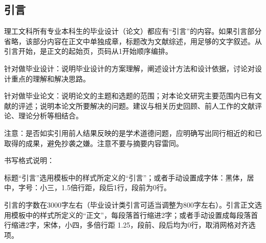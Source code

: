 	\newpage
	\tableofcontents
	\newpage
	\setcounter{page}{1}
	\begin{spacing}{1.7}
		\section*{\fontsize{15}{22.5} {\heiti 引\quad\quad 言}}
	\end{spacing}
	\begin{spacing}{1.4}
	{\songti 理工文科所有专业本科生的毕业设计（论文）都应有“引言”的内容。如果引言部分省略，该部分内容在正文中单独成章，标题改为文献综述，用足够的文字叙述。从引言开始，是正文的起始页，页码从1开始顺序编排。\par 
	针对做毕业设计：说明毕业设计的方案理解，阐述设计方法和设计依据，讨论对设计重点的理解和解决思路。\par 
	针对做毕业论文：说明论文的主题和选题的范围；对本论文研究主要范围内已有文献的评述；说明本论文所要解决的问题。建议与相关历史回顾、前人工作的文献评论、理论分析等相结合。\par 
	注意：是否如实引用前人结果反映的是学术道德问题，应明确写出同行相近的和已取得的成果，避免抄袭之嫌。注意不要与摘要内容雷同。\par 
	书写格式说明：\par 
	标题“引言”选用模板中的样式所定义的“引言”；或者手动设置成字体：黑体，居中，字号：小三，1.5倍行距，段后1行，段前为0行。\par
	引言的字数在3000字左右（毕业设计类引言可适当调整为800字左右）。引言正文选用模板中的样式所定义的“正文”，每段落首行缩进2字；或者手动设置成每段落首行缩进2字，宋体，小四，多倍行距 1.25，段前、段后均为0行，取消网格对齐选项。}
	\end{spacing}
	\newpage
